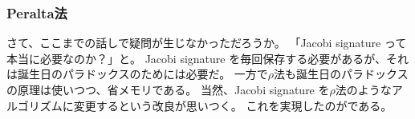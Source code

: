\subsubsection{Peralta法}
さて、ここまでの話しで疑問が生じなかっただろうか。
「Jacobi signature って本当に必要なのか？」と。
Jacobi signature を毎回保存する必要があるが、それは誕生日のパラドックスのためには必要だ。
一方で$\rho$法も誕生日のパラドックスの原理は使いつつ、省メモリである。
当然、Jacobi signature を$\rho$法のようなアルゴリズムに変更するという改良が思いつく。
これを実現したのが\cite{10.1007/978-3-0348-8295-8_11}である。


